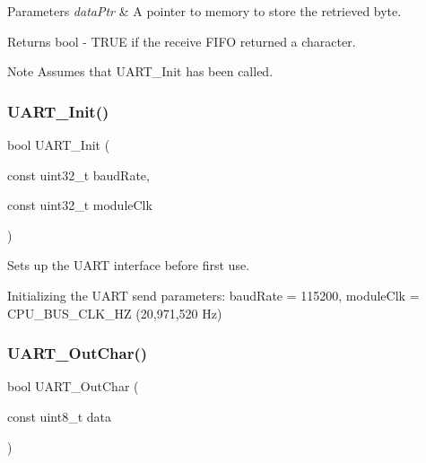 \begin{DoxyParams}{Parameters}
{\em data\+Ptr} & A pointer to memory to store the retrieved byte. \\
\hline
\end{DoxyParams}
\begin{DoxyReturn}{Returns}
bool -\/ T\+R\+UE if the receive F\+I\+FO returned a character. 
\end{DoxyReturn}
\begin{DoxyNote}{Note}
Assumes that U\+A\+R\+T\+\_\+\+Init has been called. 
\end{DoxyNote}
\mbox{\label{group__main__module_gae5760d1a086ec79a33901db253000af9}} 
\subsubsection{\texorpdfstring{U\+A\+R\+T\+\_\+\+Init()}{UART\_Init()}}
{\footnotesize\ttfamily bool U\+A\+R\+T\+\_\+\+Init (\begin{DoxyParamCaption}\item[{const uint32\+\_\+t}]{baud\+Rate,  }\item[{const uint32\+\_\+t}]{module\+Clk }\end{DoxyParamCaption})}



Sets up the U\+A\+RT interface before first use. 

Initializing the U\+A\+RT send parameters\+: baud\+Rate = 115200, module\+Clk = C\+P\+U\+\_\+\+B\+U\+S\+\_\+\+C\+L\+K\+\_\+\+HZ (20,971,520 Hz) \mbox{\label{group__main__module_gab20ebaeefd1f29d31e098ade31189dda}} 
\subsubsection{\texorpdfstring{U\+A\+R\+T\+\_\+\+Out\+Char()}{UART\_OutChar()}}
{\footnotesize\ttfamily bool U\+A\+R\+T\+\_\+\+Out\+Char (\begin{DoxyParamCaption}\item[{const uint8\+\_\+t}]{data }\end{DoxyParamCaption})}



